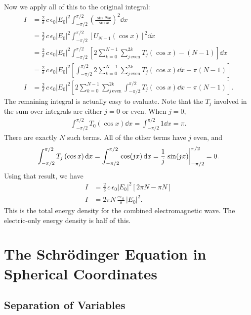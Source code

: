 \documentclass[12pt]{article}
\newcommand{\Tn}[2]{T_{#1}\left(#2\right)}
\newcommand{\Un}[2]{U_{#1}\left(#2\right)}
\numberwithin{equation}{section}
\begin{document}
Now we apply all of this to the original integral:
\begin{align*}
I &= \frac{2}{\delta} \, c \, \epsilon_0 |E_0|^2 \int_{-\pi/2}^{\pi/2} \left(\frac{\sin Nx}{\sin x}\right)^2 \dd{x} \\
&= \frac{2}{\delta} \, c \, \epsilon_0 |E_0|^2 \int_{-\pi/2}^{\pi/2} \left[\Un{N-1}{\cos x}\right]^2 \dd{x} \\
&= \frac{2}{\delta} \, c \, \epsilon_0 |E_0|^2 \int_{-\pi/2}^{\pi/2} \left[2 \sum_{k=0}^{N-1} \sum_{j \, \mathrm{even}}^{2k} \Tn{j}{\cos x} - \left(N-1\right) \right] \dd{x} \\
&= \frac{2}{\delta} \, c \, \epsilon_0 |E_0|^2 \left[\int_{-\pi/2}^{\pi/2} 2 \sum_{k=0}^{N-1} \sum_{j \, \mathrm{even}}^{2k} \Tn{j}{\cos x} \dd{x} - \pi\left(N-1\right) \right] \\
I &= \frac{2}{\delta} \, c \, \epsilon_0 |E_0|^2 \left[2 \sum_{k=0}^{N-1} \sum_{j \, \mathrm{even}}^{2k} \int_{-\pi/2}^{\pi/2} \Tn{j}{\cos x} \dd{x} - \pi\left(N-1\right) \right].
\end{align*}
The remaining integral is actually easy to evaluate. Note that the $T_j$ involved in the sum over integrals are either $j=0$ or even. When $j=0$,
\begin{align*}
\int_{-\pi/2}^{\pi/2} T_0(\cos x) \dd{x} = \int_{-\pi/2}^{\pi/2} 1 \dd{x} = \pi. 
\end{align*}
There are exactly $N$ such terms. All of the other terms have $j$ even, and
\begin{align*}
\int_{-\pi/2}^{\pi/2} \Tn{j}{\cos x} \dd{x} = \int_{-\pi/2}^{\pi/2} \cos(jx) \dd{x} = \frac{1}{j} \eval{\sin(jx)}_{-\pi/2}^{\pi/2} = 0.
\end{align*}
Using that result, we have
\begin{align*}
I &= \frac{2}{\delta} \, c \, \epsilon_0 |E_0|^2 \left[2 \pi N  - \pi N \right] \\
I &= 2\pi N \, \frac{c \, \epsilon_0}{\delta} \,  |E_0|^2.
\end{align*}
This is the total energy density for the combined electromagnetic wave. The electric-only energy density is half of this.



\newpage
\section{The Schr\"{o}dinger Equation in Spherical Coordinates}

\subsection{Separation of Variables}
\end{document}
